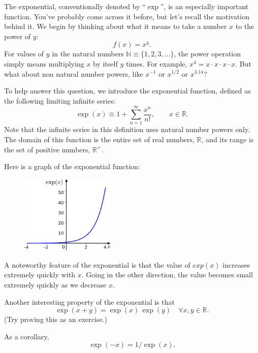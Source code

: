 \documentclass[10pt,a4paper]{article}
\begin{document}
The exponential, conventionally denoted by ``$\exp$'', is an
especially important function. You've probably come across it before,
but let's recall the motivation behind it. We begin by thinking about
what it means to take a number $x$ to the power of $y$:
\begin{equation}
f(x) = x^y.
\end{equation}
For values of $y$ in the natural numbers
$\mathbb{N} \equiv \{1,2,3,\dots\}$, the power operation simply means
multiplying $x$ by itself $y$ times. For example,
$x^4 = x \cdot x \cdot x \cdot x$. But what about non natural number
powers, like $x^{-1}$ or $x^{1/2}$ or $x^{3.14}$?

To help answer this question, we introduce the exponential function,
defined as the following limiting infinite series:
\begin{equation}
\exp(x) \equiv 1 + \sum_{n=1}^\infty\frac{x^n}{n!}, \qquad x \in \mathbb{R}.
\end{equation}
Note that the infinite series in this definition uses natural number
powers only. The domain of this function is the entire set of real
numbers, $\mathbb{R}$, and its range is the set of positive numbers,
$\mathbb{R}^+$.

Here is a graph of the exponential function: 

\begin{figure}[h]
  \centering\includegraphics[width=0.4\textwidth]{exponential}
\end{figure}

A noteworthy feature of the exponential is that the value of $exp(x)$
increases extremely quickly with $x$. Going in the other direction,
the value becomes small extremely quickly as we decrease $x$.

Another interesting property of the exponential is that
\begin{equation}
\exp(x+y) = \exp(x)\,\exp(y) \quad \forall x, y \in \mathbb{R}.
\end{equation}
(Try proving this as an exercise.)

As a corollary,
\begin{equation}
\exp(-x) = 1/\exp(x).
\end{equation}
\end{document}
